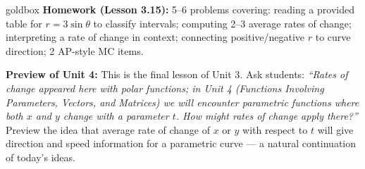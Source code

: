\documentclass[10pt]{article}
\begin{document}
\vspace{0.08in}

\begin{skillbox}{goldbox}
\textbf{Homework (Lesson 3.15):} 5--6 problems covering: reading a provided table
for $r = 3\sin\theta$ to classify intervals; computing 2--3 average rates of change;
interpreting a rate of change in context; connecting positive/negative $r$ to curve
direction; 2 AP-style MC items.

\textbf{Preview of Unit 4:} This is the final lesson of Unit 3.
Ask students: \textit{``Rates of change appeared here with polar functions; in
Unit 4 (Functions Involving Parameters, Vectors, and Matrices) we will encounter
parametric functions where both $x$ and $y$ change with a parameter $t$. How might
rates of change apply there?''} Preview the idea that average rate of change of
$x$ or $y$ with respect to $t$ will give direction and speed information for a
parametric curve --- a natural continuation of today's ideas.
\end{skillbox}
\end{document}
